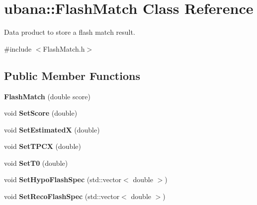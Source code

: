 \hypertarget{classubana_1_1FlashMatch}{\section{ubana\-:\-:\-Flash\-Match \-Class \-Reference}
\label{classubana_1_1FlashMatch}
}


\-Data product to store a flash match result.  




{\ttfamily \#include $<$\-Flash\-Match.\-h$>$}

\subsection*{\-Public \-Member \-Functions}
\begin{DoxyCompactItemize}
\item 
\hypertarget{classubana_1_1FlashMatch_ac6dac027acf7a820fed8b77b79983eef}{{\bfseries \-Flash\-Match} (double score)}\label{classubana_1_1FlashMatch_ac6dac027acf7a820fed8b77b79983eef}

\item 
\hypertarget{classubana_1_1FlashMatch_a914461ed5856c4dd6efd4b802a99e694}{void {\bfseries \-Set\-Score} (double)}\label{classubana_1_1FlashMatch_a914461ed5856c4dd6efd4b802a99e694}

\item 
\hypertarget{classubana_1_1FlashMatch_a75b780b23d3f90bbd87d92e13c2a9d65}{void {\bfseries \-Set\-Estimated\-X} (double)}\label{classubana_1_1FlashMatch_a75b780b23d3f90bbd87d92e13c2a9d65}

\item 
\hypertarget{classubana_1_1FlashMatch_ae68bce2f79738dbc0867f3fb76277f7c}{void {\bfseries \-Set\-T\-P\-C\-X} (double)}\label{classubana_1_1FlashMatch_ae68bce2f79738dbc0867f3fb76277f7c}

\item 
\hypertarget{classubana_1_1FlashMatch_a377ea80205d325f2605a341379fe2539}{void {\bfseries \-Set\-T0} (double)}\label{classubana_1_1FlashMatch_a377ea80205d325f2605a341379fe2539}

\item 
\hypertarget{classubana_1_1FlashMatch_aee49ac7698634e3e59b8b489dd6cc993}{void {\bfseries \-Set\-Hypo\-Flash\-Spec} (std\-::vector$<$ double $>$)}\label{classubana_1_1FlashMatch_aee49ac7698634e3e59b8b489dd6cc993}

\item 
\hypertarget{classubana_1_1FlashMatch_a1d5970b7af75cc887dba190af9388ae5}{void {\bfseries \-Set\-Reco\-Flash\-Spec} (std\-::vector$<$ double $>$)}\label{classubana_1_1FlashMatch_a1d5970b7af75cc887dba190af9388ae5}


\end{DoxyCompactItemize}
